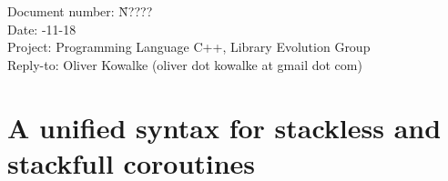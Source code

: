 \documentclass[a4paper,10pt,DIV15]{scrartcl}
\begin{document}
\small
\begin{tabbing}
    Document number: \= N????\\
    Date:            -11-18 \\
    Project:         \> Programming Language C++, Library Evolution Group\\
    Reply-to:        \> Oliver Kowalke (oliver dot kowalke at gmail dot com)\\
\end{tabbing}

\section*{A unified syntax for stackless and stackfull coroutines}


\tableofcontents











\end{document}
